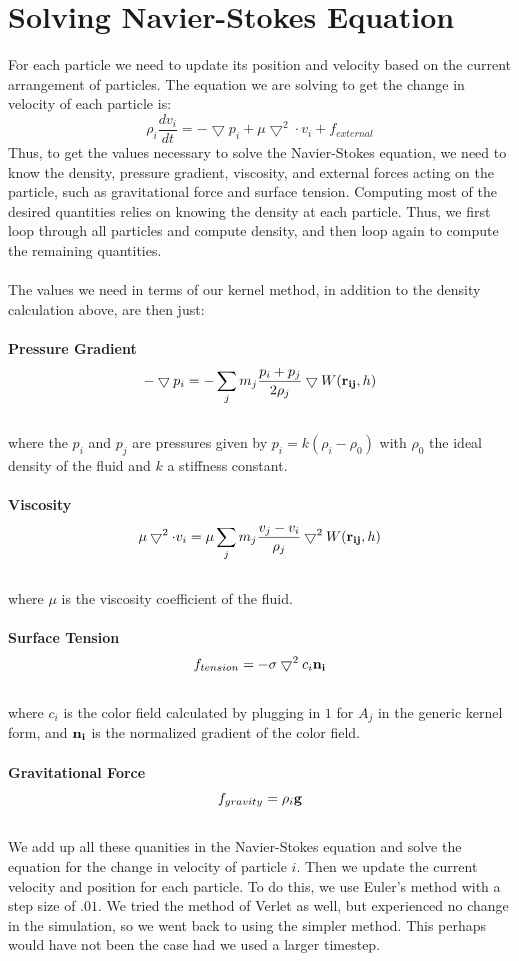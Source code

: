 \documentclass[11pt]{article}
\begin{document}
\section*{Solving Navier-Stokes Equation}
For each particle we need to update its position and velocity based on the current arrangement of particles. The equation we are solving to get the change in velocity of each particle is:
$$\rho_i \frac{dv_i}{dt} = - \bigtriangledown p_i + \mu \bigtriangledown^2 \cdot v_i + f_{external}$$
Thus, to get the values necessary to solve the Navier-Stokes equation, we need to know the density, pressure gradient, viscosity, and external forces acting on the particle, such as gravitational force and surface tension. Computing most of the desired quantities relies on knowing the density at each particle. Thus, we first loop through all particles and compute density, and then loop again to compute the remaining quantities.
\\
\\
The values we need in terms of our kernel method, in addition to the density calculation above, are then just:\\ \\
{\bf Pressure Gradient}
$$ - \bigtriangledown p_i = - \sum_{j}m_j \frac{p_i+p_j}{2\rho_j} \bigtriangledown W({\bf r_{ij}},h)$$
\\
where the $p_i$ and $p_j$ are pressures given by $p_i = k(\rho_i - \rho_0)$ with $\rho_0$ the ideal density of the fluid and $k$ a stiffness constant.
\\
\\
{\bf Viscosity}
$$ \mu \bigtriangledown^2 \cdot v_i = \mu  \sum_{j} m_j \frac{v_j-v_i}{\rho_j} \bigtriangledown^2 W({\bf r_{ij}},h) $$
\\
where $\mu$ is the viscosity coefficient of the fluid.
\\
\\
{\bf Surface Tension}
$$f_{tension} = -\sigma \bigtriangledown^2 c_i {\bf n_i}$$
\\
where $c_i$ is the color field calculated by plugging in $1$ for $A_j$ in the generic kernel form, and ${\bf n_i}$ is the normalized gradient of the color field.
\\
\\
{\bf Gravitational Force}
$$f_{gravity} = \rho_i {\bf g}$$
\\
We add up all these quanities in the Navier-Stokes equation and solve the equation for the change in velocity of particle $i$. Then we update the current velocity and position for each particle. To do this, we use Euler's method with a step size of $.01$.
We tried the method of Verlet as well, but experienced no change in the simulation, so we went back to using the simpler method. This perhaps would have not been the case had we used a larger timestep.
\end{document}
